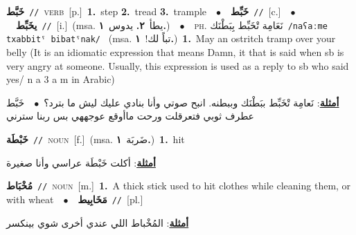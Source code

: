 \documentclass[10pt,a4paper,twoside]{article} %
\begin{document}
\begin{multicols}{2}
{\setlength\topsep{0pt}\textbf{\foreignlanguage{arabic}{خَبَّط}}\ {\color{gray}\texttt{//}\color{black}}\ \textsc{verb}\ [p.]\ \textbf{1.}~step  \textbf{2.}~tread  \textbf{3.}~trample\ \ $\bullet$\ \ \setlength\topsep{0pt}\textbf{\foreignlanguage{arabic}{خَبِّط}}\ {\color{gray}\texttt{//}\color{black}}\ [c.]\ \ $\bullet$\ \ \setlength\topsep{0pt}\textbf{\foreignlanguage{arabic}{يخَبِّط}}\ {\color{gray}\texttt{//}\color{black}}\ [i.]\ \color{gray}(msa. \foreignlanguage{arabic}{يطأ}~\foreignlanguage{arabic}{\textbf{٢.}}  \foreignlanguage{arabic}{يدوس}~\foreignlanguage{arabic}{\textbf{١.}})\color{black}\ \ $\bullet$\ \ \textsc{ph.} \color{gray} \foreignlanguage{arabic}{نَعَامِة تْخَبِّط بِبَطْنَك}\color{black}\ {\color{gray}\texttt{/{\sffamily naʕaːme txabbitˤ bibatˤnak}/}\color{black}}\ \color{gray} (msa. \foreignlanguage{arabic}{تباً لك!}~\foreignlanguage{arabic}{\textbf{١.}})\color{black}\ \textbf{1.}~May an ostritch tramp over your belly (It is an idiomatic expression that means Damn, it that is said when sb is very angry at someone. Usually, this expression is used as a reply to sb who said yes/ n a 3 a m in Arabic)\  \begin{flushright}\color{gray}\foreignlanguage{arabic}{\textbf{\underline{\foreignlanguage{arabic}{أمثلة}}}: نَعامِة تْخَبِّط ببَطْنَك وببطنه. انبح صوتي وأنا بنادي عليك ليش ما بترد؟\ $\bullet$\ \  خَبَّط عطرف ثوبي فتعرقلت ورحت ماأوقع عوجههي بس ربنا سترني}\end{flushright}\color{black}} \vspace{2mm}

{\setlength\topsep{0pt}\textbf{\foreignlanguage{arabic}{خَبْطَة}}\ {\color{gray}\texttt{//}\color{black}}\ \textsc{noun}\ [f.]\ \color{gray}(msa. \foreignlanguage{arabic}{ضَربَة}~\foreignlanguage{arabic}{\textbf{١.}})\color{black}\ \textbf{1.}~hit\  \begin{flushright}\color{gray}\foreignlanguage{arabic}{\textbf{\underline{\foreignlanguage{arabic}{أمثلة}}}: أكلت خَبْطَة عراسي وأنا صغيرة}\end{flushright}\color{black}} \vspace{2mm}

{\setlength\topsep{0pt}\textbf{\foreignlanguage{arabic}{مُخْبَاط}}\ {\color{gray}\texttt{//}\color{black}}\ \textsc{noun}\ [m.]\ \textbf{1.}~A thick stick used to hit clothes while cleaning them, or with wheat\ \ $\bullet$\ \ \setlength\topsep{0pt}\textbf{\foreignlanguage{arabic}{مَخَابِيط}}\ {\color{gray}\texttt{//}\color{black}}\ [pl.]\  \begin{flushright}\color{gray}\foreignlanguage{arabic}{\textbf{\underline{\foreignlanguage{arabic}{أمثلة}}}: المُخْباط اللي عندي أخرى شوي بينكسر}\end{flushright}\color{black}} \vspace{2mm}


\end{multicols}
\end{document}
